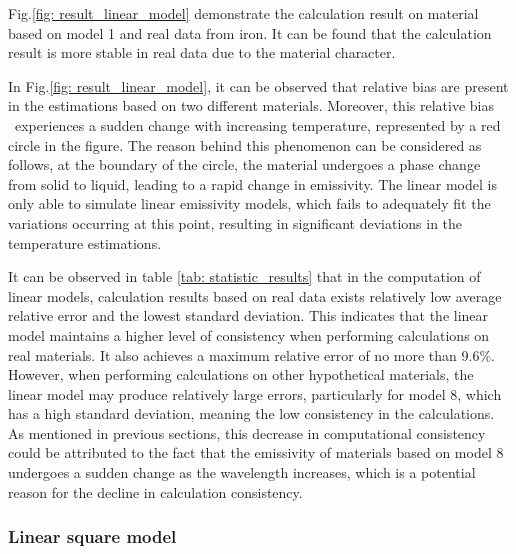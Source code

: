 Fig.\ref{fig: result_linear_model} demonstrate the calculation result on material based on 
model 1 and real data from iron. It can be found that the calculation result is more
stable in real data due to the material character. 


In Fig.\ref{fig: result_linear_model}, it can be observed that relative bias are present 
in the estimations based on two different materials. Moreover, this relative bias \
experiences a sudden change with increasing temperature, represented by a red 
circle in the figure. The reason behind this phenomenon can be considered as follows, 
at the boundary of the circle, the material undergoes a phase change from solid to liquid, 
leading to a rapid change in emissivity. The linear model is only able to  
simulate linear emissivity models, which fails to adequately fit the variations 
occurring at this point, resulting in significant deviations in the 
temperature estimations.


It can be observed in table \ref{tab: statistic_results} that in the computation of linear models, 
calculation results based on real data exists relatively low average relative error and the lowest 
standard deviation. This indicates that the linear model maintains a higher 
level of consistency when performing calculations on real materials. It also 
achieves a maximum relative error of no more than 9.6\%. However, when 
performing calculations on other hypothetical materials, the linear model may 
produce relatively large errors, particularly for model 8, which has a high standard 
deviation, meaning the low consistency in the calculations. As mentioned 
in previous sections, this decrease in computational consistency could be attributed to the 
fact that the emissivity of materials based on model 8 undergoes a sudden change 
as the wavelength increases, which is a potential reason for the decline in 
calculation consistency.


\subsubsection{Linear square model}

